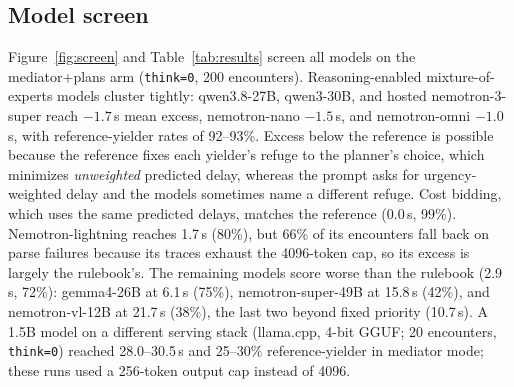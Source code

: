 \documentclass[journal]{IEEEtran}
\begin{document}
\subsection{Model screen}
Figure~\ref{fig:screen} and Table~\ref{tab:results} screen all models on the mediator+plans arm (\texttt{think=0}, 200 encounters). Reasoning-enabled mixture-of-experts models cluster tightly: qwen3.8-27B, qwen3-30B, and hosted nemotron-3-super reach $-1.7$\,s mean excess, nemotron-nano $-1.5$\,s, and nemotron-omni $-1.0$\,s, with reference-yielder rates of 92--93\%. Excess below the reference is possible because the reference fixes each yielder's refuge to the planner's choice, which minimizes \emph{unweighted} predicted delay, whereas the prompt asks for urgency-weighted delay and the models sometimes name a different refuge. Cost bidding, which uses the same predicted delays, matches the reference (0.0\,s, 99\%). Nemotron-lightning reaches 1.7\,s (80\%), but 66\% of its encounters fall back on parse failures because its traces exhaust the 4096-token cap, so its excess is largely the rulebook's. The remaining models score worse than the rulebook (2.9\,s, 72\%): gemma4-26B at 6.1\,s (75\%), nemotron-super-49B at 15.8\,s (42\%), and nemotron-vl-12B at 21.7\,s (38\%), the last two beyond fixed priority (10.7\,s). %
A 1.5B model on a different serving stack (llama.cpp, 4-bit GGUF; 20 encounters, \texttt{think=0}) reached 28.0--30.5\,s and 25--30\% reference-yielder in mediator mode; these runs used a 256-token output cap instead of 4096.
\end{document}
